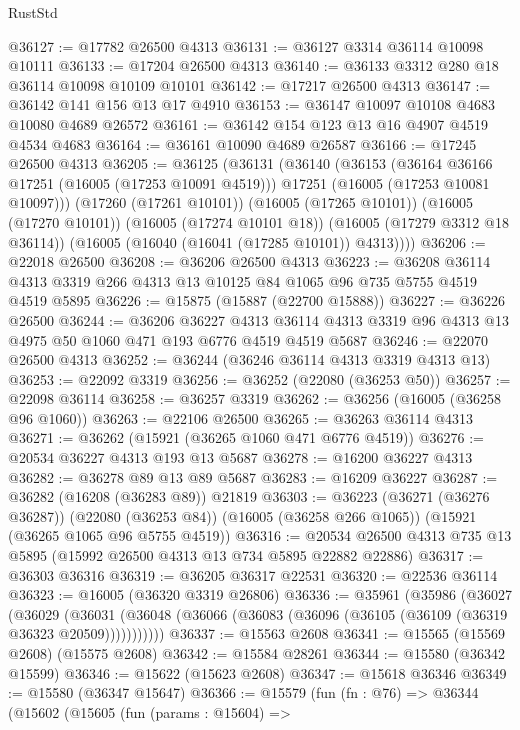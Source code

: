 \begin{lexlean}{RustStd}
\begin{coremodule}
@36127 := @17782 @26500 @4313
@36131 := @36127 @3314 @36114 @10098 @10111
@36133 := @17204 @26500 @4313
@36140 := @36133 @3312 @280 @18 @36114 @10098 @10109 @10101
@36142 := @17217 @26500 @4313
@36147 := @36142 @141 @156 @13 @17 @4910
@36153 := @36147 @10097 @10108 @4683 @10080 @4689 @26572
@36161 := @36142 @154 @123 @13 @16 @4907 @4519 @4534 @4683
@36164 := @36161 @10090 @4689 @26587
@36166 := @17245 @26500 @4313
@36205 := @36125
    (@36131
      (@36140
        (@36153
          (@36164 @36166 @17251 (@16005 (@17253 @10091 @4519)))
          @17251
          (@16005 (@17253 @10081 @10097)))
        (@17260 (@17261 @10101))
        (@16005 (@17265 @10101))
        (@16005 (@17270 @10101))
        (@16005 (@17274 @10101 @18))
        (@16005 (@17279 @3312 @18 @36114))
        (@16005 (@16040 (@16041 (@17285 @10101)) @4313))))
@36206 := @22018 @26500
@36208 := @36206 @26500 @4313
@36223 := @36208 @36114 @4313 @3319 @266 @4313 @13 @10125 @84 @1065 @96 @735 @5755 @4519 @4519 @5895
@36226 := @15875 (@15887 (@22700 @15888))
@36227 := @36226 @26500
@36244 := @36206
    @36227
    @4313
    @36114
    @4313
    @3319
    @96
    @4313
    @13
    @4975
    @50
    @1060
    @471
    @193
    @6776
    @4519
    @4519
    @5687
@36246 := @22070 @26500 @4313
@36252 := @36244 (@36246 @36114 @4313 @3319 @4313 @13)
@36253 := @22092 @3319
@36256 := @36252 (@22080 (@36253 @50))
@36257 := @22098 @36114
@36258 := @36257 @3319
@36262 := @36256 (@16005 (@36258 @96 @1060))
@36263 := @22106 @26500
@36265 := @36263 @36114 @4313
@36271 := @36262 (@15921 (@36265 @1060 @471 @6776 @4519))
@36276 := @20534 @36227 @4313 @193 @13 @5687
@36278 := @16200 @36227 @4313
@36282 := @36278 @89 @13 @89 @5687
@36283 := @16209 @36227
@36287 := @36282 (@16208 (@36283 @89)) @21819
@36303 := @36223
    (@36271 (@36276 @36287))
    (@22080 (@36253 @84))
    (@16005 (@36258 @266 @1065))
    (@15921 (@36265 @1065 @96 @5755 @4519))
@36316 := @20534 @26500 @4313 @735 @13 @5895 (@15992 @26500 @4313 @13 @734 @5895 @22882 @22886)
@36317 := @36303 @36316
@36319 := @36205 @36317 @22531
@36320 := @22536 @36114
@36323 := @16005 (@36320 @3319 @26806)
@36336 := @35961
    (@35986
      (@36027
        (@36029
          (@36031 (@36048 (@36066 (@36083 (@36096 (@36105 (@36109 (@36319 @36323 @20509)))))))))))
@36337 := @15563 @2608
@36341 := @15565 (@15569 @2608) (@15575 @2608)
@36342 := @15584 @28261
@36344 := @15580 (@36342 @15599)
@36346 := @15622 (@15623 @2608)
@36347 := @15618 @36346
@36349 := @15580 (@36347 @15647)
@36366 := @15579
    (fun (fn : @76) =>
    @36344
      (@15602
        (@15605
          (fun (params : @15604) =>

\end{coremodule}
\end{lexlean}
